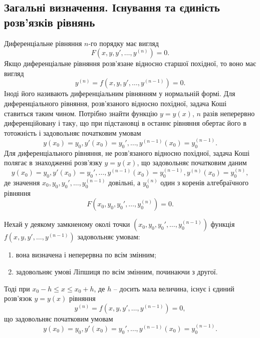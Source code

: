 \subsection{Загальні визначення. Існування та єдиність роз\-в’я\-з\-ків рівнянь}

Диференціальне рівняння $n$-го порядку має вигляд
\begin{equation*}
	F \left( x, y, y', \ldots, y^{(n)} \right) = 0.
\end{equation*}
Якщо диференціальне рівняння розв’язане відносно старшої похідної, то воно має вигляд
\begin{equation*}
	y^{(n)} = f \left( x, y, y', \ldots, y^{(n-1)} \right) = 0.
\end{equation*}
Іноді його називають диференціальним рівнянням у нормальній формі. Для диференціального рівняння, розв’язаного відносно похідної, задача Коші ставиться таким чином. Потрібно знайти функцію $y = y(x)$, $n$ разів неперервно диференційовану і таку, що при підстановці в останнє рівняння обертає його в тотожність і задовольняє початковим умовам 
\begin{equation*}
	y(x_0) = y_0, y'(x_0) = y_0', \ldots, y^{(n - 1)} (x_0) = y_0^{(n-1)}.
\end{equation*}
Для диференціального рівняння, не розв’язаного відносно похідної, задача Коші полягає в знаходженні розв’язку $y = y(x)$, що задовольняє початковим даним 
\begin{equation*}
	y(x_0) = y_0, y'(x_0) = y_0', \ldots, y^{(n - 1)} (x_0) = y_0^{(n-1)}, y^{(n)} (x_0) = y_0^{(n)},
\end{equation*}
де значення $x_0, y_0, y_0', \ldots, y_0^{(n-1)}$ довільні, а $y_0^{(n)}$ один з коренів алгебраїчного рівняння 
\begin{equation*}
	F \left( x_0, y_0, y_0', \ldots, y_0^{(n)} \right) = 0.
\end{equation*}

\begin{theorem}
	Нехай у деякому замкненому околі точки $\left(x_0, y_0, y_0', \ldots, y_0^{(n-1)}\right)$ функція $f\left(x,y,y',\ldots,y^{(n-1)}\right)$ задовольняє умовам:
	\begin{enumerate}
		\item вона визначена і неперервна по всім змінним;
		\item задовольняє умові Ліпшиця по всім змінним, починаючи з другої.
	\end{enumerate}
	Тоді при $x_0 - h \le x \le x_0 + h$, де $h$ -- досить мала величина, існує і єдиний розв’язок $y=y(x)$ рівняння
		\begin{equation*}
    	y^{(n)} = f \left( x, y, y', \ldots, y^{(n-1)} \right) = 0,
    \end{equation*}
    що задовольняє початковим умовам 
	\begin{equation*}
    	y(x_0) = y_0, y'(x_0) = y_0', \ldots, y^{(n - 1)} (x_0) = y_0^{(n-1)}.
    \end{equation*}
\end{theorem}
  
